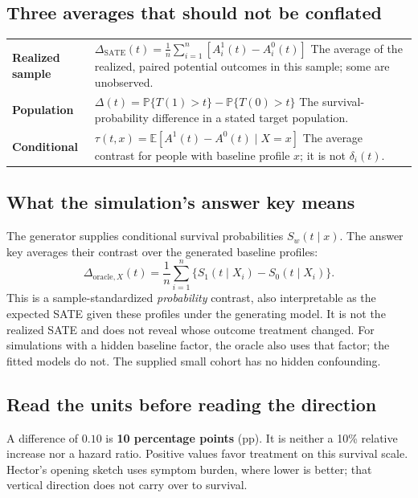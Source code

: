 \documentclass[11pt,letterpaper]{article}
\newcommand{\E}{\mathbb{E}}
\newcommand{\Prb}{\mathbb{P}}
\newcommand{\term}[1]{\textbf{\color{ink}#1}}
\begin{document}
\subsection{Three averages that should not be conflated}
\renewcommand{\arraystretch}{1.48}
\begin{tabularx}{\linewidth}{@{}p{1.24in}X@{}}
\toprule
\term{Realized sample} &
$\displaystyle\Delta_{\mathrm{SATE}}(t)=\frac1n\sum_{i=1}^n
 [A_i^1(t)-A_i^0(t)]$\newline
The average of the realized, paired potential outcomes in this sample; some are unobserved. \\
\term{Population} &
$\displaystyle\Delta(t)=\Prb\{T(1)>t\}-\Prb\{T(0)>t\}$\newline
The survival-probability difference in a stated target population. \\
\term{Conditional} &
$\displaystyle\tau(t,x)=\E[A^1(t)-A^0(t)\mid X=x]$\newline
The average contrast for people with baseline profile $x$; it is not $\delta_i(t)$. \\
\bottomrule
\end{tabularx}

\subsection{What the simulation's answer key means}
The generator supplies conditional survival probabilities $S_w(t\mid x)$.
The answer key averages their contrast over the generated baseline profiles:
\[
 \Delta_{\mathrm{oracle},X}(t)=\frac1n\sum_{i=1}^n
 \{S_1(t\mid X_i)-S_0(t\mid X_i)\}.
\]
This is a sample-standardized \emph{probability} contrast, also interpretable
as the expected SATE given these profiles under the generating model. It is
not the realized SATE and does not reveal whose outcome treatment changed.
For simulations with a hidden baseline factor, the oracle also uses that
factor; the fitted models do not. The supplied small cohort has no hidden
confounding.

\subsection{Read the units before reading the direction}
A difference of $0.10$ is \term{10 percentage points} (pp). It is neither a
10\% relative increase nor a hazard ratio. Positive values favor treatment
on this survival scale. Hector's opening sketch uses symptom burden, where
lower is better; that vertical direction does not carry over to survival.
\end{document}
